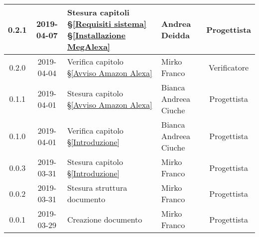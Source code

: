 \begin{center}
\begin{tabularx}{\textwidth}{|c|c|X|X|c|}
			\hline
			0.2.1 & 2019-04-07 & Stesura capitoli \S\ref{Requisiti sistema}  \S\ref{Installazione MegAlexa}  & Andrea Deidda & Progettista \\
			\hline
			0.2.0 & 2019-04-04 &Verifica capitolo \S\ref{Avviso Amazon Alexa} & Mirko Franco  & Verificatore\\
			\hline
			0.1.1 & 2019-04-01 &Stesura capitolo \S\ref{Avviso Amazon Alexa} & Bianca Andreea Ciuche & Progettista \\
			\hline
			0.1.0 & 2019-04-01 & Verifica capitolo \S\ref{Introduzione} & Bianca Andreea Ciuche & Progettista \\
			\hline
			0.0.3 & 2019-03-31 & Stesura capitolo \S\ref{Introduzione} & Mirko Franco &  Progettista\\
			\hline
			0.0.2 & 2019-03-31 & Stesura struttura documento & Mirko Franco &  Progettista\\
			\hline
			0.0.1 & 2019-03-29 & Creazione documento & Mirko Franco & Progettista\\
			\hline
		\end{tabularx}
	\end{center}
\newpage